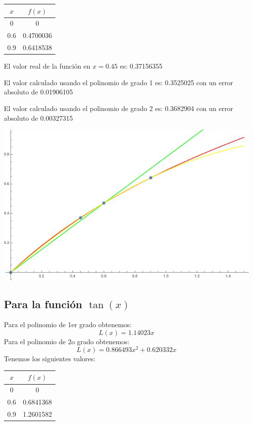 \documentclass{article}
\begin{document}
\begin{center}
    \begin{tabular}{||c c||} 
    \hline
    $x$ & $f(x)$ \\ [0.5ex] 
    \hline
    0 & 0  \\ 
    \hline
    0.6 & 0.4700036 \\
    \hline
    0.9 & 0.6418538 \\
    \hline
   \end{tabular}
\end{center}

El valor real de la función en $x=0.45$ es: 0.37156355

El valor calculado usando el polinomio de grado 1 es: 0.3525025 con un error absoluto de 0.01906105

El valor calculado usando el polinomio de grado 2 es: 0.3682904 con un error absoluto de 0.00327315


\includegraphics[scale=0.5]{Grafica3.jpeg}

\subsection{Para la función $\tan(x)$}
Para el polinomio de 1er grado obtenemos: 
$$L(x)=1.14023 x$$
Para el polinomio de 2o grado obtenemos: 
$$L(x)=0.866493 x^2+0.620332 x$$
Tenemos los siguientes valores:

\begin{center}
    \begin{tabular}{||c c||} 
    \hline
    $x$ & $f(x)$ \\ [0.5ex] 
    \hline
    0 & 0  \\ 
    \hline
    0.6 & 0.6841368 \\
    \hline
    0.9 & 1.2601582 \\
    \hline
   \end{tabular}
\end{center}
 
\end{document}
